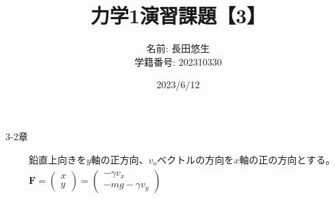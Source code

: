 \documentclass[dvipdfmx,uplatex]{jsarticle}
\title{力学1演習課題【3】}
\author{
    名前: 長田悠生\\
    学籍番号: 202310330\\
}
\date{2023/6/12}
\begin{document}
  \begin{titlepage}
    \maketitle
    \begin{center}
      \textmc{\HUGE \LaTeX}
    \end{center}
    \thispagestyle{empty}
  \end{titlepage}

  \centerline{\huge 3-2章\\}
  \vspace{10mm}
  \begin{equation}
    \begin{aligned}
        &鉛直上向きをy軸の正方向、{v}_{o}ベクトルの方向をx軸の正の方向とする。\nonumber\\
        &\bm{F} = \begin{pmatrix} x \\ y \end{pmatrix} = \begin{pmatrix} -\gamma {v}_{x} \\ -mg -\gamma {v}_{y} \end{pmatrix}\nonumber\\
    \end{aligned}
  \end{equation}
\end{document}
